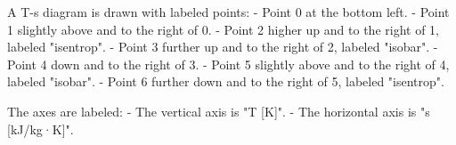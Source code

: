 A T-s diagram is drawn with labeled points:  
- Point 0 at the bottom left.  
- Point 1 slightly above and to the right of 0.  
- Point 2 higher up and to the right of 1, labeled "isentrop".  
- Point 3 further up and to the right of 2, labeled "isobar".  
- Point 4 down and to the right of 3.  
- Point 5 slightly above and to the right of 4, labeled "isobar".  
- Point 6 further down and to the right of 5, labeled "isentrop".  

The axes are labeled:  
- The vertical axis is "T [K]".  
- The horizontal axis is "s [kJ/kg·K]".